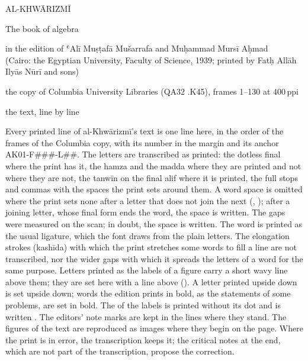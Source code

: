 \documentclass[11pt]{article}
\newcommand{\Ov}[1]{\ensuremath{\overline{\hbox{\RL{#1}}}}}
\begin{document}
\thispagestyle{empty}
\begin{center}\Large AL-KHWĀRIZMĪ\par\vspace{4mm}\LARGE The book of algebra\par{}\par\vspace{5mm}\normalsize in the edition of ʿAlī Muṣṭafā Mušarrafa and Muḥammad Mursī Aḥmad\\(Cairo: the Egyptian University, Faculty of Science, 1939; printed by Fatḥ Allāh Ilyās Nūrī and sons)\par\vspace{3mm}the copy of Columbia University Libraries (QA32 .K45), frames 1–130 at 400\,ppi\par\vspace{4mm}\large the text, line by line\end{center}\vspace{6mm}
\noindent Every printed line of al-Khwārizmī’s text is one line here, in the order of the frames of the Columbia copy, with its number in the margin and its anchor AK01-F\#\#\#-L\#\#. The letters are transcribed as printed: the dotless final  where the print has it, the hamza and the madda where they are printed and not where they are not, the tanwīn on the final alif where it is printed, the full stops and commas with the spaces the print sets around them. A word space is omitted where the print sets none after a letter that does not join the next (, ); after a joining letter, whose final form ends the word, the space is written. The gaps were measured on the scan; in doubt, the space is written. The word  is printed as the usual ligature, which the font draws from the plain letters. The elongation strokes (kashīda) with which the print stretches some words to fill a line are not transcribed, nor the wider gaps with which it spreads the letters of a word for the same purpose. Letters printed as the labels of a figure carry a short wavy line above them; they are set here with a line above ({\ArBody\RL{سطح \Ov{اٮ}}}). A letter printed upside down is set upside down; words the edition prints in bold, as the statements of some problems, are set in bold. The  of the labels is printed without its dot and is written . The editors’ note marks are kept in the lines where they stand. The figures of the text are reproduced as images where they begin on the page. Where the print is in error, the transcription keeps it; the critical notes at the end, which are not part of the transcription, propose the correction.
\end{document}
